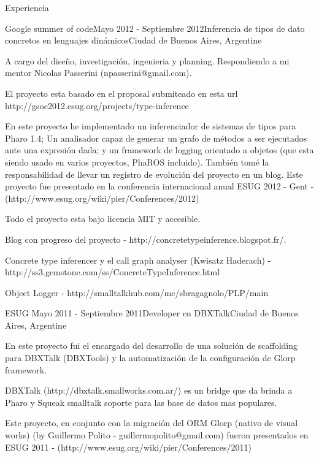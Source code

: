 \documentclass{resume} %
\begin{document}
\begin{rSection}{Experiencia}

\begin{rSubsection}{Google summer of code}{Mayo 2012 - Septiembre 2012}{Inferencia de tipos de dato concretos en lenguajes din\'amicos}{Ciudad de Buenos Aires, Argentine}
\item A cargo del dise\~no, investigaci\'on, ingenieria y planning. Respondiendo a mi mentor Nicolas Passerini (npasserini@gmail.com). 
\item El proyecto esta basado en el proposal submiteado en esta url http://gsoc2012.esug.org/projects/type-inference 
\item En este proyecto he implementado un inferenciador de sistemas de tipos para Pharo 1.4; Un analisador capaz de generar un grafo de m\'etodos a ser ejecutados ante una expresi\'on dada;  y un framework de logging orientado a objetos (que esta siendo usado en varios proyectos, PhaROS incluido). Tambi\'en tom\'e la responsabilidad de llevar un registro de evoluci\'on del proyecto en un blog. Este proyecto fue presentado en la conferencia internacional anual ESUG 2012 - Gent - (http://www.esug.org/wiki/pier/Conferences/2012) 
\item Todo el proyecto esta bajo licencia MIT y accesible.
\item Blog con progreso del proyecto - http://concretetypeinference.blogspot.fr/. 
\item Concrete type inferencer y el call graph analyser (Kwisatz Haderach) - http://ss3.gemstone.com/ss/ConcreteTypeInference.html
\item Object Logger - http://smalltalkhub.com/mc/sbragagnolo/PLP/main
\end{rSubsection}

 
\begin{rSubsection}{ESUG}{ Mayo 2011 - Septiembre 2011}{Developer en DBXTalk}{Ciudad de Buenos Aires, Argentine}
\item En este proyecto fui el encargado del desarrollo de una soluci\'on de scaffolding para DBXTalk (DBXTools) y la automatizaci\'on de la configuraci\'on de Glorp framework.
\item DBXTalk (http://dbxtalk.smallworks.com.ar/) es un bridge que da brinda a Pharo y Squeak smalltalk soporte para las base de datos mas populares. 
\item Este proyecto, en conjunto con la migraci\'on del ORM Glorp (nativo de visual works) (by Guillermo Polito - guillermopolito@gmail.com) fueron presentados en ESUG 2011 - (http://www.esug.org/wiki/pier/Conferences/2011)
\end{rSubsection}



\end{rSection}
\end{document}
